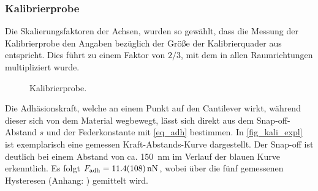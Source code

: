 \documentclass[
	a4paper,
	12pt,
	pagesize,
	ngerman
]{scrartcl}
\begin{document}
\subsubsection{Kalibrierprobe}\label{sss_kali}
Die Skalierungsfaktoren der Achsen, wurden so gewählt, dass die Messung der Kalibrierprobe den Angaben bezüglich der Größe der Kalibrierquader aus \cite{Anleitung} entspricht.
Dies führt zu einem Faktor von $2/3$, mit dem in allen Raumrichtungen multipliziert wurde.
\begin{figure}[H]
			\caption{Kalibrierprobe.}
\end{figure}
	Die Adhäsionskraft, welche an einem Punkt auf den Cantilever wirkt, während dieser sich von dem Material wegbewegt, lässt sich direkt aus dem Snap-off-Abstand $s$ und der Federkonstante mit \cref{eq_adh} bestimmen.
	In \cref{fig_kali_expl} ist exemplarisch eine gemessen Kraft-Abstands-Kurve dargestellt.
	Der Snap-off ist deutlich bei einem Abstand von ca. \SI{150}{nm} im Verlauf der blauen Kurve erkenntlich.
		Es folgt $F_\text{adh}=\SI{11.4+-10.8}{nN}$, wobei über die fünf gemessenen Hysteresen (Anhang: ) gemittelt wird.
\end{document}
